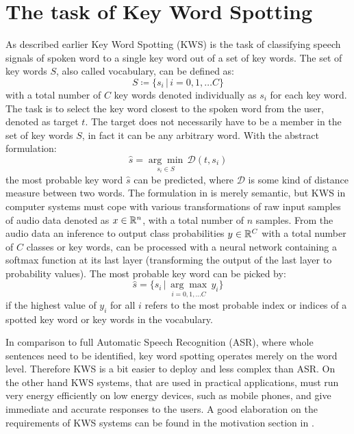 
\section{The task of Key Word Spotting}\label{sec:intro_kws}
\thesisStateReady
As described earlier Key Word Spotting (KWS) is the task of classifying speech signals of spoken word to a single key word out of a set of key words.
The set of key words $S$, also called vocabulary, can be defined as:
\begin{equation}\label{eq:intro_kws_dict}
	S \coloneqq \{s_i \, | \, i = 0, 1, \dots C\}
\end{equation}
with a total number of $C$ key words denoted individually as $s_i$ for each key word.
The task is to select the key word closest to the spoken word from the user, denoted as target $t$.
The target does not necessarily have to be a member in the set of key words $S$, in fact it can be any arbitrary word.
With the abstract formulation:
\begin{equation}\label{eq:intro_kws_task}
	\hat{s} = \underset{s_i \in S}{\arg \min} \, \mathcal{D}(t, s_i)
\end{equation}
the most probable key word $\hat{s}$ can be predicted, where $\mathcal{D}$ is some kind of distance measure between two words.
The formulation in  is merely semantic, but KWS in computer systems must cope with various transformations of raw input samples of audio data denoted as $x \in \mathbb{R}^n$, with a total number of $n$ samples.
From the audio data an inference to output class probabilities $y \in \mathbb{R}^C$ with a total number of $C$ classes or key words, can be processed with a neural network containing a softmax function at its last layer (transforming the output of the last layer to probability values).
The most probable key word can be picked by:
\begin{equation}\label{eq:intro_kws_class}
	\hat{s} = \{s_i \, | \, \underset{i = 0, 1, \dots C}{\arg \max} \, y_i\}
\end{equation}
if the highest value of $y_i$ for all $i$ refers to the most probable index or indices of a spotted key word or key words in the vocabulary.

In comparison to full Automatic Speech Recognition (ASR), where whole sentences need to be identified, key word spotting operates merely on the word level.
Therefore KWS is a bit easier to deploy and less complex than ASR.
On the other hand KWS systems, that are used in practical applications, must run very energy efficiently on low energy devices, such as mobile phones, and give immediate and accurate responses to the users. 
A good elaboration on the requirements of KWS systems can be found in the motivation section in \cite{Warden2018}.

